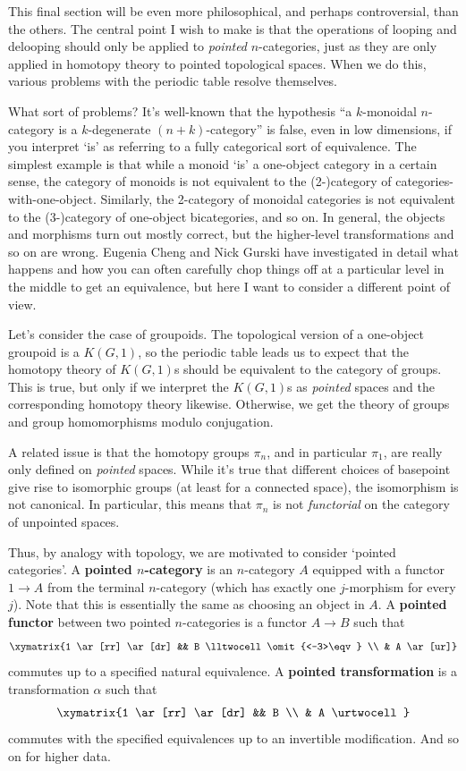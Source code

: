 \documentclass[12pt]{amsart}
\begin{document}
This final section will be even more philosophical, and perhaps
controversial, than the others.  The central point I wish to make is
that the operations of looping and delooping should only be
applied to \emph{pointed} $n$-categories, just as they are only
applied in homotopy theory to pointed topological spaces.  When we do
this, various problems with the periodic table resolve themselves.

What sort of problems?  It's well-known that the hypothesis ``a
$k$-monoidal $n$-category is a $k$-degenerate $(n+k)$-category'' is
false, even in low dimensions, if you interpret `is' as referring to a
fully categorical sort of equivalence.  The simplest example is that
while a monoid `is' a one-object category in a certain sense, the
category of monoids is not equivalent to the (2-)category of
categories-with-one-object.  Similarly, the 2-category of monoidal
categories is not equivalent to the (3-)category of one-object
bicategories, and so on.  In general, the objects and morphisms turn
out mostly correct, but the higher-level transformations and so on are
wrong.  Eugenia Cheng and Nick Gurski have investigated in detail what
happens and how you can often carefully chop things off at a
particular level in the middle to get an equivalence, but here I want
to consider a different point of view.

Let's consider the case of groupoids.  The topological version of a
one-object groupoid is a $K(G,1)$, so the periodic table leads us to
expect that the homotopy theory of $K(G,1)$s should be equivalent to
the category of groups.  This is true, but only if we interpret the
$K(G,1)$s as \emph{pointed} spaces and the corresponding homotopy
theory likewise.  Otherwise, we get the theory of groups and group
homomorphisms modulo conjugation.

A related issue is that the homotopy groups $\pi_n$, and in particular
$\pi_1$, are really only defined on \emph{pointed} spaces.  While it's
true that different choices of basepoint give rise to isomorphic
groups (at least for a connected space), the isomorphism is not
canonical.  In particular, this means that $\pi_n$ is not
\emph{functorial} on the category of unpointed spaces.

Thus, by analogy with topology, we are motivated to consider `pointed
categories'.  A \textbf{pointed $n$-category} is an $n$-category $A$
equipped with a functor $1\to A$ from the terminal $n$-category (which
has exactly one $j$-morphism for every $j$).  Note that this is
essentially the same as choosing an object in $A$.  A \textbf{pointed
  functor} between two pointed $n$-categories is a functor $A\to B$
such that
\[\xymatrix{1 \ar[rr] \ar[dr] && B \lltwocell\omit{<-3>\eqv} \\ & A \ar[ur]}\]
commutes up to a specified natural equivalence.  A \textbf{pointed
  transformation} is a transformation $\alpha$ such that
\[\xymatrix{1 \ar[rr] \ar[dr] && B \\ & A \urtwocell}\]
commutes with the specified equivalences up to an invertible
modification.  And so on for higher data.
\end{document}
